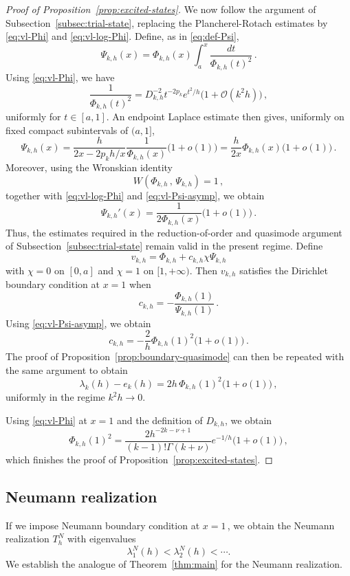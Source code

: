 \documentclass[11pt]{amsart}
\numberwithin{equation}{section}
\theoremstyle{remark}
\begin{document}
\begin{proof}[Proof of Proposition~\ref{prop:excited-states}]
\medskip
\noindent
We now follow the argument of Subsection~\ref{subsec:trial-state}, replacing the
Plancherel-Rotach estimates by \eqref{eq:vl-Phi} and
\eqref{eq:vl-log-Phi}. Define, as in \eqref{eq:def-Psi},
%
\[	\Psi_{k,h}(x)
	=
	\Phi_{k,h}(x)
	\int_a^x
	\frac{dt}{\Phi_{k,h}(t)^2}\,.\]
%
Using \eqref{eq:vl-Phi}, we have
%
\[	\frac{1}{\Phi_{k,h}(t)^2}
	=
	D_{k,h}^{-2}
	t^{-2p_k}
	e^{t^2/h}
	\bigl(1+\mathcal O(k^2h)\bigr)\,,\]
%
uniformly for $t\in[a,1]$. An endpoint Laplace estimate then gives, uniformly on fixed compact
subintervals of $(a,1]$,
\begin{equation}\label{eq:vl-Psi-asymp}
	\Psi_{k,h}(x)
	=
	\frac{h}
	{2x-2p_kh/x}
	\frac{1}{\Phi_{k,h}(x)}
	\bigl(1+o(1)\bigr)=\frac{h}{2x}{\Phi_{k,h}(x)}
	\bigl(1+o(1)\bigr)\,.
\end{equation}
%
Moreover, using the Wronskian identity
%
\[	W(\Phi_{k,h}\,,\,\Psi_{k,h})=1\,,\]
%
together with \eqref{eq:vl-log-Phi} and
\eqref{eq:vl-Psi-asymp}, we obtain
\begin{equation}\label{eq:vl-Psi-prime}
	\Psi_{k,h}'(x)
	=
	\frac{1}{2\Phi_{k,h}(x)}
	\bigl(1+o(1)\bigr)\,.
\end{equation}
Thus, the estimates required in the reduction-of-order and quasimode
argument of Subsection~\ref{subsec:trial-state} remain valid in the present regime. Define
\[v_{k,h}=\Phi_{k,h}+c_{k,h}\chi\Psi_{k,h}\]
with $\chi=0$ on $[0,a]$ and $\chi=1$ on $[1,+\infty)$. Then $v_{k,h}$ satisfies the Dirichlet boundary condition at $x=1$ when
\[c_{k,h}=-\frac{\Phi_{k,h}(1)}{\Psi_{k,h}(1)}\,.\]
Using \eqref{eq:vl-Psi-asymp}, we obtain
%
%
\[c_{k,h}
	=
	-\frac{2}{h}\Phi_{k,h}(1)^2
	\bigl(1+o(1)\bigr)\,.\]
%
The proof of Proposition~\ref{prop:boundary-quasimode} can then be
repeated with the same argument to obtain
%
\[	\lambda_k(h)-e_k(h)
	=
	2h\,\Phi_{k,h}(1)^2
	\bigl(1+o(1)\bigr)\,,\]
%
uniformly in the regime $k^2h\to0$.

\medskip\noindent
Using \eqref{eq:vl-Phi} at $x=1$ and the definition
of $D_{k,h}$, we obtain
%
\[	\Phi_{k,h}(1)^2
	=
	\frac{2h^{-2k-\nu+1}}
	{(k-1)!\Gamma(k+\nu)}
	e^{-1/h}
	\bigl(1+o(1)\bigr)\,,
\]
%
which finishes the proof of Proposition~\ref{prop:excited-states}.
\end{proof}
\subsection{Neumann realization}\label{subsec:Neumann}

If we impose Neumann boundary condition at $x=1\,$, we obtain the Neumann realization $T_h^N$ with eigenvalues
\[\lambda_1^N(h)<\lambda_2^N(h)<\cdots.\]
We establish the analogue of Theorem~\ref{thm:main} for the Neumann realization.
\end{document}
